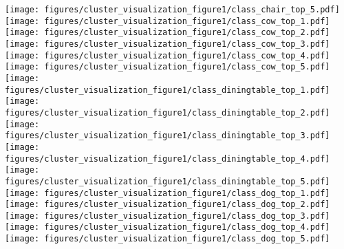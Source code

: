 \documentclass{article}
\begin{document}
\begin{figure*}[htbp]
\texttt{[image: figures/cluster\_visualization\_figure1/class\_chair\_top\_5.pdf]}\hspace{0.2cm}
\texttt{[image: figures/cluster\_visualization\_figure1/class\_cow\_top\_1.pdf]}\hspace{-0.12cm}
\texttt{[image: figures/cluster\_visualization\_figure1/class\_cow\_top\_2.pdf]}\hspace{-0.12cm}
\texttt{[image: figures/cluster\_visualization\_figure1/class\_cow\_top\_3.pdf]}\hspace{-0.12cm}
\texttt{[image: figures/cluster\_visualization\_figure1/class\_cow\_top\_4.pdf]}\hspace{-0.12cm}
\texttt{[image: figures/cluster\_visualization\_figure1/class\_cow\_top\_5.pdf]}\vspace{0.2cm}\\
\texttt{[image: figures/cluster\_visualization\_figure1/class\_diningtable\_top\_1.pdf]}\hspace{-0.12cm}
\texttt{[image: figures/cluster\_visualization\_figure1/class\_diningtable\_top\_2.pdf]}\hspace{-0.12cm}
\texttt{[image: figures/cluster\_visualization\_figure1/class\_diningtable\_top\_3.pdf]}\hspace{-0.12cm}
\texttt{[image: figures/cluster\_visualization\_figure1/class\_diningtable\_top\_4.pdf]}\hspace{-0.12cm}
\texttt{[image: figures/cluster\_visualization\_figure1/class\_diningtable\_top\_5.pdf]}\hspace{0.2cm}
\texttt{[image: figures/cluster\_visualization\_figure1/class\_dog\_top\_1.pdf]}\hspace{-0.12cm}
\texttt{[image: figures/cluster\_visualization\_figure1/class\_dog\_top\_2.pdf]}\hspace{-0.12cm}
\texttt{[image: figures/cluster\_visualization\_figure1/class\_dog\_top\_3.pdf]}\hspace{-0.12cm}
\texttt{[image: figures/cluster\_visualization\_figure1/class\_dog\_top\_4.pdf]}\hspace{-0.12cm}
\texttt{[image: figures/cluster\_visualization\_figure1/class\_dog\_top\_5.pdf]}\vspace{0.2cm}\\

\end{figure*}
\end{document}
